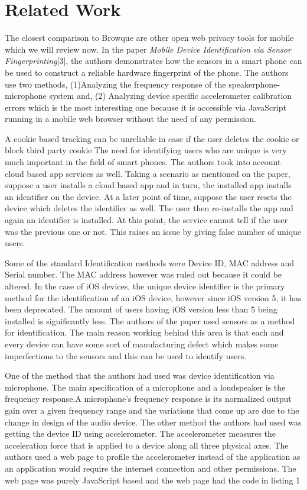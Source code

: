 \documentclass[journal]{IEEEtran}
\begin{document}
\section*{Related Work}

The closest comparison to Browque are other open web privacy tools for mobile
which we will review now. In the paper \textit{Mobile Device Identification via Sensor
Fingerprinting}[3], the authors demonstrates how the sensors in a smart phone can be used
to construct a reliable hardware fingerprint of the phone. The authors use two
methods, (1)Analyzing the frequency response of the speakerphone-microphone
system and, (2) Analyzing device specific accelerometer calibration errors which
is the most interesting one because it is accessible via JavaScript running in a mobile
web browser without the need of any permission. 

A cookie based tracking can be unreliable in case if the user deletes the cookie
or block third party cookie.The need for identifying users who are unique is very
much important in the field of smart phones. The authors took into account cloud
based app services as well. Taking a scenario as mentioned on the paper, suppose
a user installs a cloud based app and in turn, the installed app installs an
identifier on the device. At a later point of time, suppose the user resets the
device which deletes the identifier as well. The user then re-installs the app
and again an identifier is installed. At this point, the service cannot tell if
the user was the previous one or not. This raises an issue by giving false
number of unique users.

Some of the standard Identification methods were Device ID, MAC address and
Serial number. The MAC address however was ruled out because it could be
altered. In the case of iOS devices, the unique device identifier is the primary
method for the identification of an iOS device, however since iOS version 5, it
has been deprecated. The amount of users having iOS version less than 5 being
installed is significantly less. The authors of the paper used sensors as a method for
identification. The main reason working behind this area is that each and every
device can have some sort of manufacturing defect which makes some imperfections
to the sensors and this can be used to identify users.

One of the method that the authors had used was device identification via
microphone. The main specification of a microphone and a loudspeaker is the
frequency response.A microphone’s frequency response is its normalized output
gain over a given frequency range and the variations that come up are due to the
change in design of the audio device. The other method the authors had used was
getting the device ID using accelerometer. The accelerometer measures the
acceleration force that is applied to a device along all three physical axes. The
authors used a web page to profile the accelerometer instead of the application
as an application would require the internet connection and other permissions.
The web page was purely JavaScript based and the web page had the code in listing 1
\end{document}

